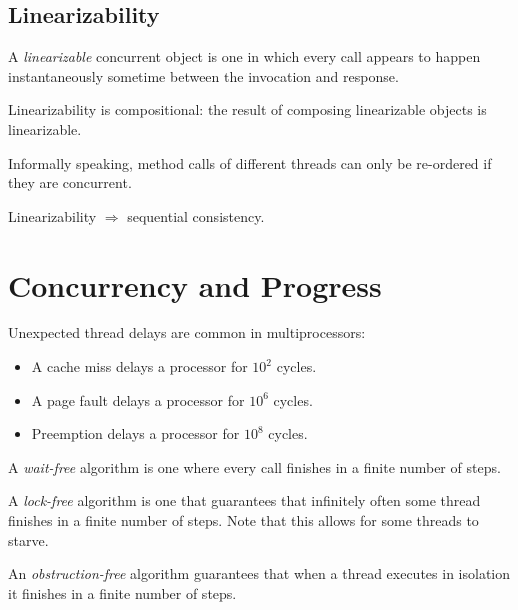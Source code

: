 \subsection{Linearizability}
\begin{definition}
    A \textit{linearizable} concurrent object is one in which every call appears to happen instantaneously sometime between the invocation and response.
\end{definition}

\begin{lemma}
    Linearizability is compositional: the result of composing linearizable objects is linearizable.
\end{lemma}

Informally speaking, method calls of different threads can only be re-ordered if they are concurrent.

\begin{lemma}
    Linearizability $\Rightarrow$ sequential consistency.
\end{lemma}

\section{Concurrency and Progress}
\begin{fact}
    Unexpected thread delays are common in multiprocessors:
    \begin{itemize}
        \item A cache miss delays a processor for $10^2$ cycles.
        \item A page fault delays a processor for $10^6$ cycles.
        \item Preemption delays a processor for $10^8$ cycles.
    \end{itemize}
\end{fact}

\begin{definition}
    A \textit{wait-free} algorithm is one where every call finishes in a finite number of steps. 
\end{definition}

\begin{definition}
    A \textit{lock-free} algorithm is one that guarantees that infinitely often some thread finishes in a finite number of steps. Note that this allows for some threads to starve.
\end{definition}

\begin{definition}
    An \textit{obstruction-free} algorithm guarantees that when a thread executes in isolation it finishes in a finite number of steps.
\end{definition}

